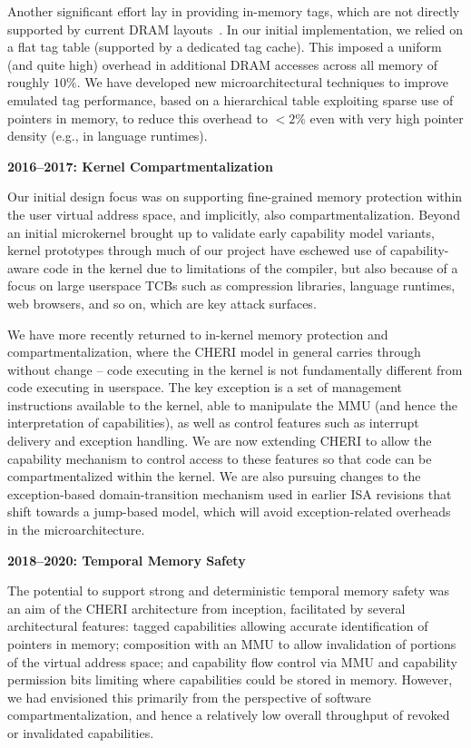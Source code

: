 Another significant effort lay in providing in-memory tags, which are not
directly supported by current DRAM layouts~\cite{joannou2017:tagged-memory, UCAM-CL-TR-936}.
In our initial implementation, we relied on a flat tag table (supported by a
dedicated tag cache).
This imposed a uniform (and quite high) overhead in additional DRAM accesses
across all memory of roughly $10\%$.
We have developed new microarchitectural techniques to improve emulated tag
performance, based on a hierarchical table exploiting sparse use of pointers
in memory, to reduce this overhead to $<2\%$ even with very high pointer
density (e.g., in language runtimes).

\medskip
\noindent
\textbf{2016--2017: Kernel Compartmentalization}

\smallskip
\noindent
Our initial design focus was on supporting fine-grained memory protection
within the user virtual address space, and implicitly, also
compartmentalization.
Beyond an initial microkernel brought up to validate early capability model
variants, kernel prototypes through much of our project have eschewed use of
capability-aware code in the kernel due to limitations of the compiler, but
also because of a focus on large userspace TCBs such as compression libraries,
language runtimes, web browsers, and so on, which are key attack surfaces.

We have more recently returned to in-kernel memory protection and
compartmentalization, where the CHERI model in general carries through without
change -- code executing in the kernel is not fundamentally different from
code executing in userspace.
The key exception is a set of management instructions available to the kernel,
able to manipulate the MMU (and hence the interpretation of capabilities), as
well as control features such as interrupt delivery and exception handling.
We are now extending CHERI to allow the capability mechanism to control access
to these features so that code can be compartmentalized within the kernel.
We are also pursuing changes to the exception-based domain-transition
mechanism used in earlier ISA revisions that shift towards a jump-based model,
which will avoid exception-related overheads in the microarchitecture.

\medskip
\noindent
\textbf{2018--2020: Temporal Memory Safety}

The potential to support strong and deterministic temporal memory safety was
an aim of the CHERI architecture from inception, facilitated by several
architectural features: tagged capabilities allowing accurate identification
of pointers in memory; composition with an MMU to allow invalidation of
portions of the virtual address space; and capability flow control via MMU
and capability permission bits limiting where capabilities could be stored in
memory.
However, we had envisioned this primarily from the perspective of software
compartmentalization, and hence a relatively low overall throughput of
revoked or invalidated capabilities.

